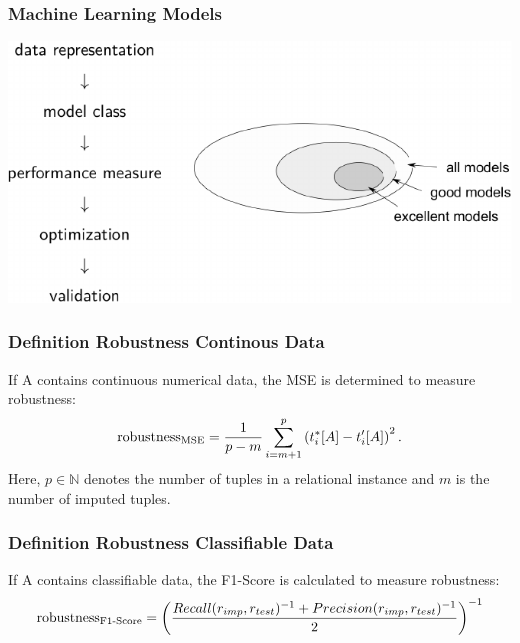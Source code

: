 \documentclass{beamer}
\begin{document}
\begin{frame}
    \frametitle{Machine Learning Models}
    \includegraphics[width=.95\textwidth]{mi-models.pdf}
\end{frame}

\begin{frame}
    \frametitle{Definition Robustness Continous Data}
If \textsc{A} contains continuous numerical data, the MSE is determined to measure robustness:
\begin{align}\label{eq:robustness-mse}
    \text{robustness\textsubscript{MSE}} = \frac{1}{p-m}\sum_{i=m+1}^{p} \left(t_{i}^{\ast}[A] - t_{i}^{\prime}[A]\right)^2.
\end{align}
Here, \( p \in \mathbb{N} \) denotes the number of tuples in a relational instance and \( m \) is the number of imputed tuples.
\end{frame}

\begin{frame}
    \frametitle{Definition Robustness Classifiable Data}
    If \textsc{A} contains classifiable data, the F1-Score is calculated to measure robustness:
    \begin{align}\label{eq:robustness-f1-score}
        \text{robustness\textsubscript{F1-Score}} = {\left(\frac{Recall(r_{imp}, r_{test})^{-1} + Precision(r_{imp}, r_{test})^{-1}}{2}\right)}^{-1}
    \end{align}
\end{frame}
\end{document}
